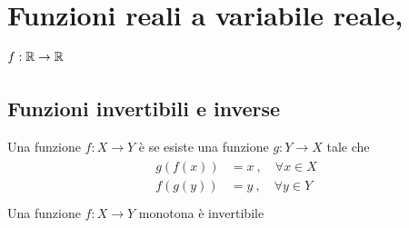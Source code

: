 \documentclass[letterpaper,10pt,italian]{jupyterBook}
\begin{document}
\chapter{Funzioni reali a variabile reale, \protect\(f: \mathbb{R} \rightarrow \mathbb{R}\protect\)}
\label{\detokenize{ch/precalculus/real-functions:funzioni-reali-a-variabile-reale-f-mathbb-r-rightarrow-mathbb-r}}\label{\detokenize{ch/precalculus/real-functions:math-hs-precalculus-real-functions}}\label{\detokenize{ch/precalculus/real-functions::doc}}
\sphinxAtStartPar
{} 

\sphinxAtStartPar
{}


\section{Funzioni invertibili e inverse}
\label{\detokenize{ch/precalculus/real-functions:funzioni-invertibili-e-inverse}}\label{\detokenize{ch/precalculus/real-functions:math-hs-precalculus-real-functions-inverse}}
\sphinxAtStartPar
Una funzione \(f: X \rightarrow Y\) è  se esiste una funzione \(g: Y \rightarrow X\) tale che
\begin{equation*}
\begin{split}\begin{aligned}
  g\left( f(x) \right) & = x \ , \quad \forall x \in X \\
  f\left( g(y) \right) & = y \ , \quad \forall y \in Y \\
\end{aligned}\end{split}
\end{equation*}
\sphinxAtStartPar
Una funzione \(f: X \rightarrow Y\) monotona è invertibile

\sphinxstepscope
\end{document}
